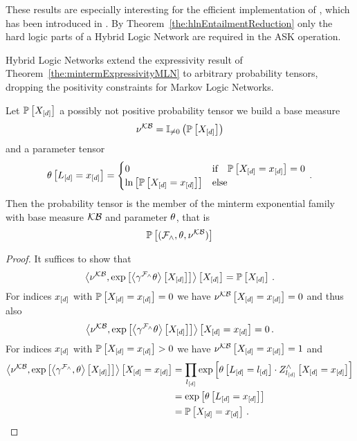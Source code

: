These results are especially interesting for the efficient implementation of , which has been introduced in .
By Theorem~\ref{the:hlnEntailmentReduction} only the hard logic parts of a Hybrid Logic Network are required in the ASK operation.


Hybrid Logic Networks extend the expressivity result of Theorem~\ref{the:mintermExpressivityMLN} to arbitrary probability tensors, dropping the positivity constraints for Markov Logic Networks.

\begin{theorem}\label{the:mintermExpressivityHLN}
	Let $\mathbb{P}\left[X_{[d]}\right]$ a possibly not positive probability tensor we build a base measure
		\[ \nu^{\mathcal{KB}} = \mathbb{I}_{\neq0}\left(\mathbb{P}\left[X_{[d]}\right]\right) \]
	and a parameter tensor
	\begin{align*}
		\theta\left[L_{[d]}=x_{[d]}\right]
		= \begin{cases}
			0 & \text{if} \quad \mathbb{P}\left[X_{[d]}=x_{[d]}\right] = 0  \\
			\ln \left[ \mathbb{P}\left[X_{[d]}=x_{[d]}\right] \right] & \text{else} 
		\end{cases} \, . 
	\end{align*}
	Then the probability tensor is the member of the minterm exponential family with base measure $\mathcal{KB}$ and parameter $\theta$, that is
		\[ \mathbb{P}\left[(\mathcal{F}_{\land},\theta,\nu^{\mathcal{KB}})\right]\]
\end{theorem}
\begin{proof}
	It suffices to show that 
		\[ \left\langle \nu^{\mathcal{KB}}, \mathrm{exp}\left[\left\langle 
		\gamma^{\mathcal{F}_{\land}}\theta
		\right\rangle \left[ 
		X_{[d]}
		 \right]\right]\right\rangle \left[ X_{[d]} \right] = \mathbb{P}\left[X_{[d]}\right] \, . \]
	For indices $x_{[d]}$ with $\mathbb{P}\left[X_{[d]}=x_{[d]}\right]=0$ we have $\nu^{\mathcal{KB}}\left[X_{[d]}=x_{[d]}\right]=0$ and thus also 
		\[ \left\langle \nu^{\mathcal{KB}}, \mathrm{exp}\left[\left\langle 
		\gamma^{\mathcal{F}_{\land}}\theta
		\right\rangle \left[ 
		X_{[d]}
		 \right]\right]\right\rangle \left[ X_{[d]}=x_{[d]} \right] = 0 \, . \]
	For indices $x_{[d]}$ with $\mathbb{P}\left[X_{[d]}=x_{[d]}\right]>0$ we have $\nu^{\mathcal{KB}}\left[X_{[d]}=x_{[d]}\right]=1$ and
	\begin{align*}
		 \left\langle \nu^{\mathcal{KB}}, \mathrm{exp}\left[\left\langle 
		\gamma^{\mathcal{F}_{\land}},\theta
		\right\rangle \left[ 
		X_{[d]}
		 \right]\right]\right\rangle \left[ X_{[d]}=x_{[d]} \right] 
		&= \prod_{l_{[d]}} \mathrm{exp}\left[\theta\left[L_{[d]}=l_{[d]}\right] \cdot Z^{\land}_{l_{[d]}}\left[X_{[d]}=x_{[d]}\right]\right] \\
		&=  \mathrm{exp}\left[\theta\left[L_{[d]}=x_{[d]}\right]\right] \\
		&=  \mathbb{P}\left[X_{[d]}=x_{[d]}\right] \, .
	\end{align*}
\end{proof}

